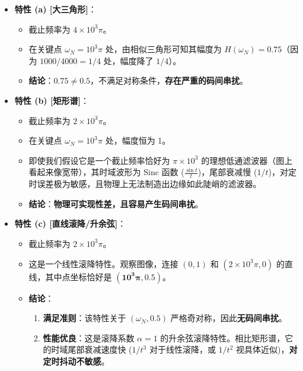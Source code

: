 \documentclass[a4paper,11pt]{ctexart}
\begin{document}
    \begin{itemize}
        \item \textbf{特性 (a) [大三角形]}：
            \begin{itemize}
                \item 截止频率为 $4\times 10^3\pi$。
                \item 在关键点 $\omega_N = 10^3\pi$ 处，由相似三角形可知其幅度为 $H(\omega_N) = 0.75$（因为 $1000/4000 = 1/4$ 处，幅度降了 $1/4$）。
                \item \textbf{结论}：$0.75 \neq 0.5$，不满足对称条件，\textbf{存在严重的码间串扰}。
            \end{itemize}
            
        \item \textbf{特性 (b) [矩形谱]}：
            \begin{itemize}
                \item 截止频率为 $2\times 10^3\pi$。
                \item 在关键点 $\omega_N = 10^3\pi$ 处，幅度恒为 1。
                \item 即使我们假设它是一个截止频率恰好为 $\pi \times 10^3$ 的理想低通滤波器（图上看起来像宽带），其时域波形为 Sinc 函数 ($\frac{\sin t}{t}$)，尾部衰减慢 ($1/t$)，对定时误差极为敏感，且物理上无法制造出边缘如此陡峭的滤波器。
                \item \textbf{结论}：\textbf{物理可实现性差，且容易产生码间串扰}。
            \end{itemize}
            
        \item \textbf{特性 (c) [直线滚降/升余弦]}：
            \begin{itemize}
                \item 截止频率为 $2\times 10^3\pi$。
                \item 这是一个线性滚降特性。观察图像，连接 $(0,1)$ 和 $(2\times 10^3\pi, 0)$ 的直线，其中点坐标恰好是 $(\mathbf{10^3\pi, 0.5})$。
                \item \textbf{结论}：
                    \begin{enumerate}
                        \item \textbf{满足准则}：该特性关于 $(\omega_N, 0.5)$ 严格奇对称，因此\textbf{无码间串扰}。
                        \item \textbf{性能优良}：这是滚降系数 $\alpha=1$ 的升余弦滚降特性。相比矩形谱，它的时域尾部衰减速度快 ($1/t^3$ 对于线性滚降，或 $1/t^2$ 视具体近似)，\textbf{对定时抖动不敏感}。
                    \end{enumerate}
            \end{itemize}
    \end{itemize}
\end{document}
